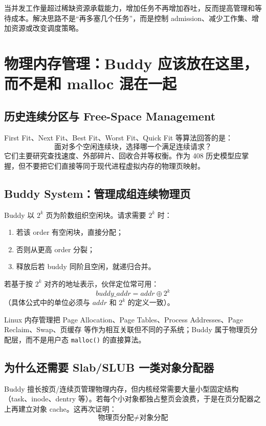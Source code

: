 \documentclass[11pt,a4paper]{ctexart}
\newcommand{\code}[1]{\texttt{#1}}
\begin{document}
\begin{bridge}
当并发工作量超过稀缺资源承载能力，增加任务不再增加吞吐，反而提高管理和等待成本。解决思路不是“再多塞几个任务”，而是控制 admission、减少工作集、增加资源或改变调度策略。
\end{bridge}

\section{物理内存管理：Buddy 应该放在这里，而不是和 malloc 混在一起}

\subsection{历史连续分区与 Free-Space Management}
First Fit、Next Fit、Best Fit、Worst Fit、Quick Fit 等算法回答的是：
\[
\boxed{\text{面对多个空闲连续块，选择哪一个满足连续请求？}}
\]
它们主要研究查找速度、外部碎片、回收合并等权衡。作为 408 历史模型应掌握，但不要把它们直接等同于现代进程虚拟内存的物理页映射。

\subsection{Buddy System：管理成组连续物理页}
Buddy 以 $2^k$ 页为阶数组织空闲块。请求需要 $2^k$ 时：
\begin{enumerate}
  \item 若该 order 有空闲块，直接分配；
  \item 否则从更高 order 分裂；
  \item 释放后若 buddy 同阶且空闲，就递归合并。
\end{enumerate}
若基于按 $2^k$ 对齐的地址表示，伙伴定位常可用：
\[
\boxed{buddy\_addr = addr \oplus 2^k}
\]
（具体公式中的单位必须与 $addr$ 和 $2^k$ 的定义一致）。

\begin{eng}[工程定位]
Linux 内存管理把 Page Allocation、Page Tables、Process Addresses、Page Reclaim、Swap、页缓存 等作为相互关联但不同的子系统；Buddy 属于物理页分配层，而不是用户态 \code{malloc()} 的直接算法。
\end{eng}

\subsection{为什么还需要 Slab/SLUB 一类对象分配器}
Buddy 擅长按页/连续页管理物理内存，但内核经常需要大量小型固定结构（task、inode、dentry 等）。若每个小对象都独占整页会浪费，于是在页分配器之上再建立对象 cache。这再次证明：
\[
\boxed{\text{物理页分配} \neq \text{对象分配}}
\]
\end{document}

